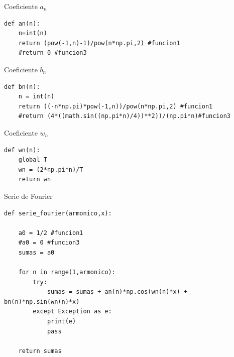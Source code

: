 \documentclass[
	12pt, %
]{fphw}
\begin{document}
Coeficiente $a_{n}$
\begin{verbatim}
def an(n):
    n=int(n)
    return (pow(-1,n)-1)/pow(n*np.pi,2) #funcion1
    #return 0 #funcion3
\end{verbatim}

Coeficiente $b_{n}$
\begin{verbatim}
def bn(n):
    n = int(n)
    return ((-n*np.pi)*pow(-1,n))/pow(n*np.pi,2) #funcion1
    #return (4*((math.sin((np.pi*n)/4))**2))/(np.pi*n)#funcion3
\end{verbatim}

Coeficiente $w_{n}$
\begin{verbatim}
def wn(n):
    global T
    wn = (2*np.pi*n)/T
    return wn
\end{verbatim}

Serie de Fourier
\begin{verbatim}
def serie_fourier(armonico,x):

    a0 = 1/2 #funcion1
    #a0 = 0 #funcion3
    sumas = a0

    for n in range(1,armonico):
        try:
            sumas = sumas + an(n)*np.cos(wn(n)*x) + bn(n)*np.sin(wn(n)*x)
        except Exception as e:
            print(e)
            pass
        
    return sumas
\end{verbatim}

\end{document}
